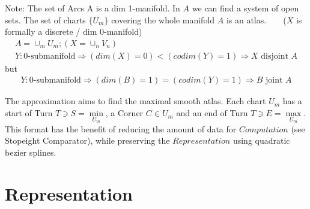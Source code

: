\documentclass{report}
\begin{document}
Note: The set of Arcs A is a dim 1-manifold. In $A$ we can find a system of open sets. The set of charts $\{U_{m}\}$ covering the whole manifold $A$ is an atlas. ~\cite[.1.]{Fomenko} ~\cite[]{Wall} ($X$ is formally a discrete / dim 0-manifold)
\begin{align}
A = \cup_{m}U_{m}; (X = \cup_{n}V_{n})\\
Y: \text{0-submanifold} \Rightarrow (dim(X)=0)<(codim(Y)=1) \Rightarrow X \text{ disjoint } A
\end{align}
but
\begin{align}
Y: \text{0-submanifold} \Rightarrow (dim(B)=1)=(codim(Y)=1) \Rightarrow B \text{ joint } A
\end{align}
\iffalse
Within $f$ we are assigning a sequence of three points to compact Hausdorf invervals ~\cite[\nopp 6.1.3.]{Mortad}:
\begin{equation}
\{x_{n}\}_{n \in \mathbb{N}} \mapsto \{S,C,E\}
\end{equation}\\
\fi
The approximation aims to find the maximal smooth atlas. Each chart $U_{m}$ has a start of Turn $T \ni S = \min \limits _{U_{m}}$, a Corner $C \in U_{m}$ and an end of Turn $T \ni E = \max \limits _{U_{m}}$. This format has the benefit of reducing the amount of data for $Computation$ (see Stopeight Comparator), while preserving the $Representation$ using quadratic bezier splines.

\chapter{Representation}
\end{document}
